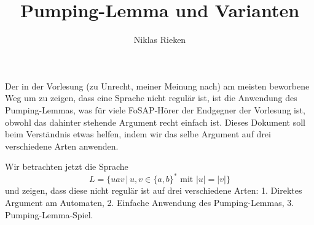 \documentclass[11pt, a4paper]{article}
\author{Niklas Rieken}
\title{Pumping-Lemma und Varianten}
\theoremstyle{definition}
\theoremstyle{plain}
\begin{document}
\maketitle

Der in der Vorlesung (zu Unrecht, meiner Meinung nach) am meisten beworbene Weg um zu zeigen, dass eine Sprache nicht regulär ist, ist die Anwendung des Pumping-Lemmas, was für viele FoSAP-Hörer der Endgegner der Vorlesung ist, obwohl das dahinter stehende Argument recht einfach ist. Dieses Dokument soll beim Verständnis etwas helfen, indem wir das selbe Argument auf drei verschiedene Arten anwenden.

Wir betrachten jetzt die Sprache 
$$
	L = \{ uav \,\vert\, u, v \in \{ a, b \}^\ast \text{ mit } \left| u \right| = \left| v \right| \} 
$$
und zeigen, dass diese nicht regulär ist auf drei verschiedene Arten: 1. Direktes Argument am Automaten, 2. Einfache Anwendung des Pumping-Lemmas, 3. Pumping-Lemma-Spiel.
\end{document}
